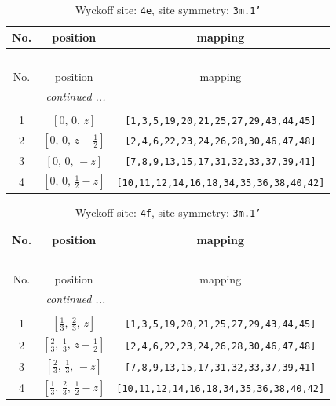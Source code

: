 \documentclass[fleqn,8pt]{jsarticle}
\begin{document}
\begin{longtable}{ccc}
\caption{Wyckoff site: {\tt 4e}, site symmetry: {\tt 3m.1'}}
 \\
 \hline \hline
No. & position & mapping \\ \hline \endfirsthead

\multicolumn{2}{l}{\tablename\ \thetable{}} \\
 \hline \hline
No. & position & mapping \\ \hline \endhead

 \hline \hline
\multicolumn{2}{r}{\footnotesize\it continued ...} \\ \endfoot

 \hline \hline
\multicolumn{2}{r}{} \\ \endlastfoot

1 & $\left[ 0,\, 0,\, z \right]$ & {\tt [1,3,5,19,20,21,25,27,29,43,44,45]} \\ \hline
2 & $\left[ 0,\, 0,\, z + \frac{1}{2} \right]$ & {\tt [2,4,6,22,23,24,26,28,30,46,47,48]} \\ \hline
3 & $\left[ 0,\, 0,\, - z \right]$ & {\tt [7,8,9,13,15,17,31,32,33,37,39,41]} \\ \hline
4 & $\left[ 0,\, 0,\, \frac{1}{2} - z \right]$ & {\tt [10,11,12,14,16,18,34,35,36,38,40,42]} \\
\end{longtable}
\renewcommand{\arraystretch}{1.2}
\begin{longtable}{ccc}
\caption{Wyckoff site: {\tt 4f}, site symmetry: {\tt 3m.1'}}
 \\
 \hline \hline
No. & position & mapping \\ \hline \endfirsthead

\multicolumn{2}{l}{\tablename\ \thetable{}} \\
 \hline \hline
No. & position & mapping \\ \hline \endhead

 \hline \hline
\multicolumn{2}{r}{\footnotesize\it continued ...} \\ \endfoot

 \hline \hline
\multicolumn{2}{r}{} \\ \endlastfoot

1 & $\left[ \frac{1}{3},\, \frac{2}{3},\, z \right]$ & {\tt [1,3,5,19,20,21,25,27,29,43,44,45]} \\ \hline
2 & $\left[ \frac{2}{3},\, \frac{1}{3},\, z + \frac{1}{2} \right]$ & {\tt [2,4,6,22,23,24,26,28,30,46,47,48]} \\ \hline
3 & $\left[ \frac{2}{3},\, \frac{1}{3},\, - z \right]$ & {\tt [7,8,9,13,15,17,31,32,33,37,39,41]} \\ \hline
4 & $\left[ \frac{1}{3},\, \frac{2}{3},\, \frac{1}{2} - z \right]$ & {\tt [10,11,12,14,16,18,34,35,36,38,40,42]} \\
\end{longtable}
\end{document}
